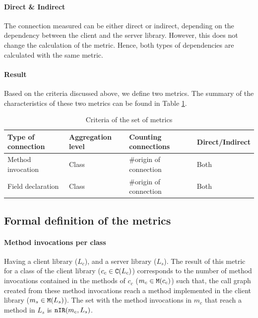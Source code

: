 \paragraph{Direct \& Indirect}

The connection measured can be either direct or indirect, depending on the dependency between the client and the server library. However, this does not change the calculation of the metric. Hence, both types of dependencies are calculated with the same metric.

\paragraph{Result}
Based on the criteria discussed above, we define two metrics. The summary of the characteristics of these two metrics can be found in Table \ref{table:per-class-characteristics}.

\begin{table}[h]
    \begin{center}
    \begin{tabular}{|l|l|l|l|}
    \hline
    Type of connection & Aggregation level & Counting connections & Direct/Indirect \\ \hline
    Method invocation & Class & \#origin of connection & Both \\
    Field declaration & Class & \#origin of connection & Both \\
    \hline
    \end{tabular}
    \end{center}
    \caption{Criteria of the set of metrics}
    \label{table:per-class-characteristics}
\end{table}

\subsection{Formal definition of the metrics}

\paragraph{Method invocations per class}
Having a client library ($L_c$), and a server library ($L_s$). The result of this metric for a class of the client library ($c_c \in \verb|C|(L_c)$) corresponds to the number of method invocations contained in the methods of $c_c$ ($m_c \in \verb|M|(c_c)$) such that, the call graph created from these method invocations reach a method implemented in the client library ($m_s \in \verb|M|(L_s)$). The set with the method invocations in $m_c$ that reach a method in $L_s$ is $\verb|nIR|(m_c, L_s)$.

